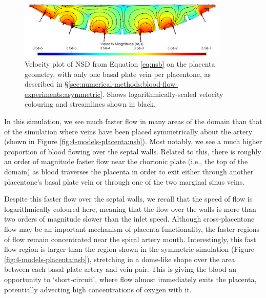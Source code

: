             \begin{figure}
                \includegraphics[width=0.9\textwidth]{diagrams/results-mri/simulated-placenta/simulated-placenta-velocity.png}
                \caption{Velocity plot of NSD from Equation \eqref{eq:nsb} on the placenta geometry, with only one basal plate vein per placentone, as described in \S\ref{sec:numerical-methods:blood-flow-experiments:asymmetric}. Shows logarithmically-scaled velocity colouring and streamlines shown in black.}
                \label{fig:asymmetric-placenta}
            \end{figure}

            In this simulation, we see much faster flow in many areas of the domain than that of the simulation where veins have been placed symmetrically about the artery (shown in Figure \ref{fig:4-models-placenta:nsb}). Most notably, we see a much higher proportion of blood flowing over the septal walls. Related to this, there is roughly an order of magnitude faster flow near the chorionic plate (i.e., the top of the domain) as blood traverses the placenta in order to exit either through another placentone's basal plate vein or through one of the two marginal sinus veins.
            
            Despite this faster flow over the septal walls, we recall that the speed of flow is logarithmically coloured here, meaning that the flow over the walls is more than two orders of magnitude slower than the inlet speed. Although cross-placentone flow may be an important mechanism of placenta functionality, the faster regions of flow remain concentrated near the spiral artery mouth. Interestingly, this fast flow region is larger than the region shown in the symmetric simulation (Figure \ref{fig:4-models-placenta:nsb}), stretching in a dome-like shape over the area between each basal plate artery and vein pair. This is giving the blood an opportunity to `short-circuit', where flow almost immediately exits the placenta, potentially advecting high concentrations of oxygen with it.

